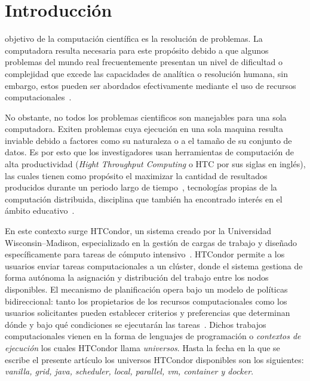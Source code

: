 \section{Introducción}
 objetivo de la computación científica es la resolución
de problemas. La computadora resulta necesaria para este propósito debido a
que algunos problemas del mundo real frecuentemente presentan un nivel de dificultad
o complejidad que excede las capacidades de analítica o resolución humana, sin embargo,
estos pueden ser abordados efectivamente mediante el uso
de recursos computacionales~\cite{landau01}.


No obstante, no todos los problemas cientificos son
manejables para una sola computadora. Exiten problemas cuya ejecución en una sola maquina resulta
inviable debido a factores como su naturaleza o a el tamaño de su conjunto de datos. Es por esto
que los investigadores usan herramientas de computación de alta productividad
(\textit{Hight Throughput Computing} o HTC por sus siglas en inglés), las cuales tienen como
propósito el maximizar la cantidad de resultados producidos durante un periodo
largo de tiempo~\cite{juve-01},
tecnologías propias de la computación distribuida, disciplina que también
ha encontrado interés en el ámbito educativo~\cite{Senol-01}.

En este contexto surge HTCondor, un sistema creado por la
Universidad Wisconsin–Madison, especializado en la gestión de cargas
de trabajo y diseñado específicamente para tareas de cómputo intensivo~\cite{chang-01, htcondor-description}.
HTCondor permite a los usuarios enviar tareas computacionales a un clúster,
donde el sistema gestiona de forma autónoma la asignación y distribución del
trabajo entre los nodos disponibles. El mecanismo de planificación opera bajo un
modelo de políticas bidireccional: tanto los propietarios de los recursos computacionales
como los usuarios solicitantes pueden establecer criterios y preferencias
que determinan dónde y bajo qué condiciones se ejecutarán las tareas~\cite{htcondor-description}.
Dichos trabajos computacionales vienen en la forma de lenguajes de programación
o \textit{contextos de ejecución} los cuales HTCondor llama
\textit{universos}. Hasta la fecha en la que se escribe el presente artículo
los universos HTCondor disponibles son los siguientes: \textit{vanilla, grid, java, scheduler,
	local, parallel, vm, container y docker}.


